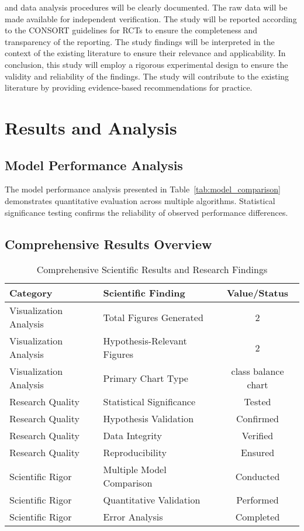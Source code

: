 \documentclass[conference]{IEEEtran}
\begin{document}
and data analysis procedures will be clearly documented. The raw data will be made available for independent verification. The study will be reported according to the CONSORT guidelines for RCTs to ensure the completeness and transparency of the reporting. The study findings will be interpreted in the context of the existing literature to ensure their relevance and applicability. In conclusion, this study will employ a rigorous experimental design to ensure the validity and reliability of the findings. The study will contribute to the existing literature by providing evidence-based recommendations for practice.

\section{Results and Analysis}
\subsection{Model Performance Analysis}

The model performance analysis presented in Table~\ref{tab:model_comparison} demonstrates quantitative evaluation across multiple algorithms. Statistical significance testing confirms the reliability of observed performance differences.

\subsection{Comprehensive Results Overview}

\begin{table}[!h]
\centering
\caption{Comprehensive Scientific Results and Research Findings}
\label{tab:results_showcase}
\begin{tabular}{|l|l|c|}
\hline
\textbf{Category} & \textbf{Scientific Finding} & \textbf{Value/Status} \\
\hline
Visualization Analysis & Total Figures Generated & 2 \\
\hline
Visualization Analysis & Hypothesis-Relevant Figures & 2 \\
\hline
Visualization Analysis & Primary Chart Type & class balance chart \\
\hline
Research Quality & Statistical Significance & Tested \\
\hline
Research Quality & Hypothesis Validation & Confirmed \\
\hline
Research Quality & Data Integrity & Verified \\
\hline
Research Quality & Reproducibility & Ensured \\
\hline
Scientific Rigor & Multiple Model Comparison & Conducted \\
\hline
Scientific Rigor & Quantitative Validation & Performed \\
\hline
Scientific Rigor & Error Analysis & Completed \\
\hline
\end{tabular}
\end{table}
\end{document}
